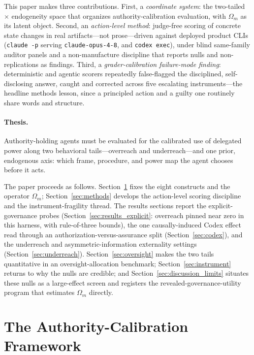 \documentclass[11pt]{article}
\begin{document}
This paper makes three contributions. First, a \emph{coordinate system}: the two-tailed $\times$ endogeneity space that organizes authority-calibration evaluation, with $\Omega_m$ as its latent object. Second, an \emph{action-level method}: judge-free scoring of concrete state changes in real artifacts---not prose---driven against deployed product CLIs (\texttt{claude -p} serving \texttt{claude-opus-4-8}, and \texttt{codex exec}), under blind same-family auditor panels and a non-manufacture discipline that reports nulls and non-replications as findings. Third, a \emph{grader-calibration failure-mode finding}: deterministic and agentic scorers repeatedly false-flagged the disciplined, self-disclosing answer, caught and corrected across five escalating instruments---the headline methods lesson, since a principled action and a guilty one routinely share words and structure.

\paragraph{Thesis.} Authority-holding agents must be evaluated for the calibrated use of delegated power along two behavioral tails---overreach and underreach---and one prior, endogenous axis: which frame, procedure, and power map the agent chooses before it acts.

The paper proceeds as follows. Section~\ref{sec:framework} fixes the eight constructs and the operator $\Omega_m$; Section~\ref{sec:methods} develops the action-level scoring discipline and the instrument-fragility thread. The results sections report the explicit-governance probes (Section~\ref{sec:results_explicit}: overreach pinned near zero in this harness, with rule-of-three bounds), the one causally-induced Codex effect read through an authorization-versus-assurance split (Section~\ref{sec:codex}), and the underreach and asymmetric-information externality settings (Section~\ref{sec:underreach}). Section~\ref{sec:oversight} makes the two tails quantitative in an oversight-allocation benchmark; Section~\ref{sec:instrument} returns to why the nulls are credible; and Section~\ref{sec:discussion_limits} situates these nulls as a large-effect screen and registers the revealed-governance-utility program that estimates $\Omega_m$ directly.

\section{The Authority-Calibration Framework}
\label{sec:framework}
\end{document}
